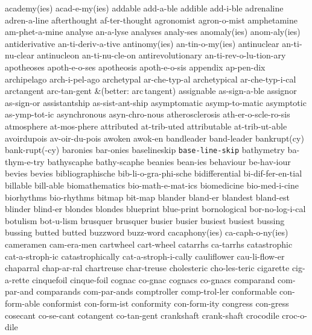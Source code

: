 \begingroup
\eightpoint
\1 academy(ies)		acad-e-my(ies)
\1 addable		add-a-ble
\1 addible		add-i-ble
\1 adrenaline		adren-a-line
\1 afterthought 	af-ter-thought
\1 agronomist		agron-o-mist
\1 amphetamine		am-phet-a-mine
\1 analyse		an-a-lyse
\1 analyses		analy-ses\thinspace*
\1 anomaly(ies)		anom-aly(ies)
\1 antiderivative	an-ti-deriv-a-tive
\1 antinomy(ies)	an-tin-o-my(ies)
\1 antinuclear		an-ti-nu-clear
\1 antinucleon		an-ti-nu-cle-on
\1 antirevolutionary	an-ti-rev-o-lu-tion-ary
\1 apotheoses		apoth-e-o-ses
\1 apotheosis		apoth-e-o-sis
\1 appendix		ap-pen-dix
\1 archipelago		arch-i-pel-ago
\1 archetypal		ar-che-typ-al
\1 archetypical		ar-che-typ-i-cal
\1 arctangent		arc-tan-gent
\tabalign		&\null\quad (better: arc\,tangent)\cr
\1 assignable		as-sign-a-ble
\1 assignor		as-sign-or
\1 assistantship	as-sist-ant-ship
\1 asymptomatic		asymp-to-matic
\1 asymptotic		as-ymp-tot-ic
\1 asynchronous		asyn-chro-nous
\1 atherosclerosis	ath-er-o-scle-ro-sis
\1 atmosphere		at-mos-phere
\1 attributed		at-trib-uted
\1 attributable		at-trib-ut-able
\1 avoirdupois		av-oir-du-pois
\1 awoken		awok-en
\1 bandleader		band-leader
\1 bankrupt(cy)		bank-rupt(-cy)
\1 baronies		bar-onies
\1 baselineskip 	{\tt\bs base-line-skip}
\1 bathymetry		ba-thym-e-try
\1 bathyscaphe		bathy-scaphe
\1 beanies		bean-ies
\1 behaviour		be-hav-iour
\1 bevies		bevies
\1 bibliographische	bib-li-o-gra-phi-sche
\1 bidifferential	bi-dif-fer-en-tial
\1 billable		bill-able
\1 biomathematics	bio-math-e-mat-ics
\1 biomedicine		bio-med-i-cine
\1 biorhythms		bio-rhythms
\1 bitmap		bit-map
\1 blander		bland-er
\1 blandest		bland-est
\1 blinder		blind-er
\1 blondes		blondes
\1 blueprint		blue-print
\1 bornological 	bor-no-log-i-cal
\1 botulism		bot-u-lism
\1 brusquer		brusquer
\1 busier		busier
\1 busiest		busiest
\1 bussing		bussing
\1 butted		butted
\1 buzzword		buzz-word
\1 cacaphony(ies)	ca-caph-o-ny(ies)
\1 cameramen		cam-era-men
\1 cartwheel		cart-wheel
\1 catarrhs		ca-tarrhs
\1 catastrophic		cat-a-stroph-ic
\1 catastrophically	cat-a-stroph-i-cally
\1 cauliflower		cau-li-flow-er
\1 chaparral		chap-ar-ral
\1 chartreuse		char-treuse
\1 cholesteric		cho-les-teric
\1 cigarette		cig-a-rette
\1 cinquefoil		cinque-foil
\1 cognac		co-gnac
\1 cognacs		co-gnacs
\1 comparand		com-par-and
\1 comparands		com-par-ands
\1 comptroller		comp-trol-ler
\1 conformable		con-form-able
\1 conformist		con-form-ist
\1 conformity		con-form-ity
\1 congress		con-gress
\1 cosecant		co-se-cant
\1 cotangent		co-tan-gent
\1 crankshaft		crank-shaft
\1 crocodile		croc-o-dile

